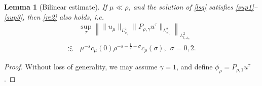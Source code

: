 \documentclass[11pt,letterpaper,reqno]{amsart}
\numberwithin{equation}{section}
\newtheorem{lemma}[theorem]{Lemma}
\theoremstyle{definition}
\theoremstyle{remark}
\begin{document}
\begin{lemma}[Bilinear estimate] \label{lem_linbie}
	If $  \mu\ll \rho $, and the solution of \eqref{lsq} satisfies \eqref{sup1}--\eqref{sup3}, then \eqref{re2} also holds, i.e.
	\begin{align} \label{linbie}
		& \sup_{\tau} \left\| \| u_\mu\|_{L^2_{\widehat{x}_\gamma}}  \|   P_{\rho,\gamma } u^\tau\|_{L^2_{\widehat{x}_\gamma}}  \right\|_{L^2_{t,x_\gamma}} \\
		\lesssim &\,\mu ^{-s} c_\mu (0) \rho^{-s-\frac 12-\sigma} c_\rho(\sigma),~~\sigma=0, 2.\nonumber 
	\end{align}
\end{lemma}
\begin{proof}
	Without loss of generality, we may assume $ \gamma =1 $, and define $\phi_\rho=   P_{\rho,1} u^\tau $.


\end{proof}
\end{document}
